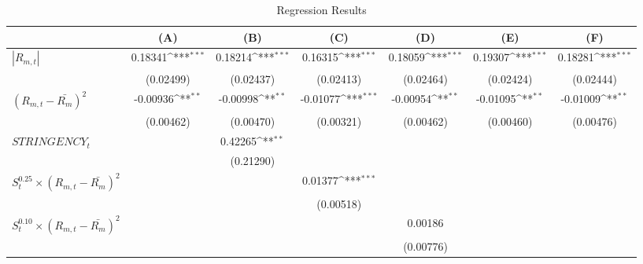 \begin{table}[htbp]\small \centering
\begin{threeparttable}
\def\sym#1{\ifmmode^{#1}\else\(^{#1}\)\fi}
\caption{Regression Results \label{reg1}}
\begin{tabular}{l*{6}{c}}
\toprule
                    &\multicolumn{1}{c}{(A)}         &\multicolumn{1}{c}{(B)}         &\multicolumn{1}{c}{(C)}         &\multicolumn{1}{c}{(D)}         &\multicolumn{1}{c}{(E)}         &\multicolumn{1}{c}{(F)}         \\
\midrule
$|R_{m,t}|$&     0.18341\sym{***}&     0.18214\sym{***}&     0.16315\sym{***}&     0.18059\sym{***}&     0.19307\sym{***}&     0.18281\sym{***}\\
                    &   (0.02499)         &   (0.02437)         &   (0.02413)         &   (0.02464)         &   (0.02424)         &   (0.02444)         \\
\addlinespace
$(R_{m,t}-\bar{R_m})^2$&    -0.00936\sym{**} &    -0.00998\sym{**} &    -0.01077\sym{***}&    -0.00954\sym{**} &    -0.01095\sym{**} &    -0.01009\sym{**} \\
                    &   (0.00462)         &   (0.00470)         &   (0.00321)         &   (0.00462)         &   (0.00460)         &   (0.00476)         \\
\addlinespace
$STRINGENCY_t$    &                     &     0.42265\sym{**} &                     &                     &                     &                     \\
                    &                     &   (0.21290)         &                     &                     &                     &                     \\
\addlinespace
$S_t^{0.25}\times{(R_{m,t}-\bar{R_m})^2}$&                     &                     &     0.01377\sym{***}&                     &                     &                     \\
                    &                     &                     &   (0.00518)         &                     &                     &                     \\
\addlinespace
$S_t^{0.10}\times{(R_{m,t}-\bar{R_m})^2}$&                     &                     &                     &     0.00186         &                     &                     \\
                    &                     &                     &                     &   (0.00776)         &                     &                     \\

\end{tabular}
\end{threeparttable}
\end{table}

